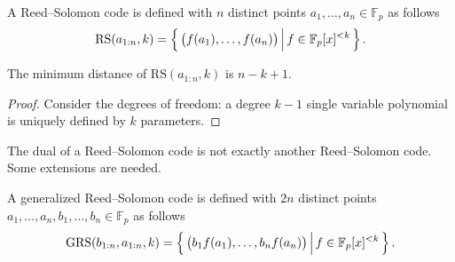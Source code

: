 \begin{definition}
    A Reed--Solomon code is defined with $n$ distinct points $a_1,\ldots,a_n\in\mathbb{F}_p$ as follows
    \begin{equation}
        \mathrm{RS}(a_{1:n},k) = \left\{\,{\left(f(a_1),\ldots,f(a_n)\right)}\,\middle\vert\,{f\in\mathbb{F}_p[x]^{<k}}\,\right\}.
    \end{equation}
\end{definition}
\begin{theorem}\label{thm:w7_RS_min_dist}
    The minimum distance of $\mathrm{RS}(a_{1:n},k)$ is $n-k+1$.
\end{theorem}
\begin{proof}
    Consider the degrees of freedom: a degree $k-1$ single variable polynomial is uniquely defined by $k$ parameters.
\end{proof}

The dual of a Reed--Solomon code is not exactly another Reed--Solomon code. Some extensions are needed.
\begin{definition}
    A generalized Reed--Solomon code is defined with $2n$ distinct points $a_1,\ldots,a_n,b_1,\ldots,b_n\in\mathbb{F}_p$ as follows
    \begin{equation}
        \mathrm{GRS}(b_{1:n},a_{1:n},k) = \left\{\,{\left(b_1f(a_1),\ldots,b_nf(a_n)\right)}\,\middle\vert\,{f\in\mathbb{F}_p[x]^{<k}}\,\right\}.
    \end{equation}
\end{definition}

